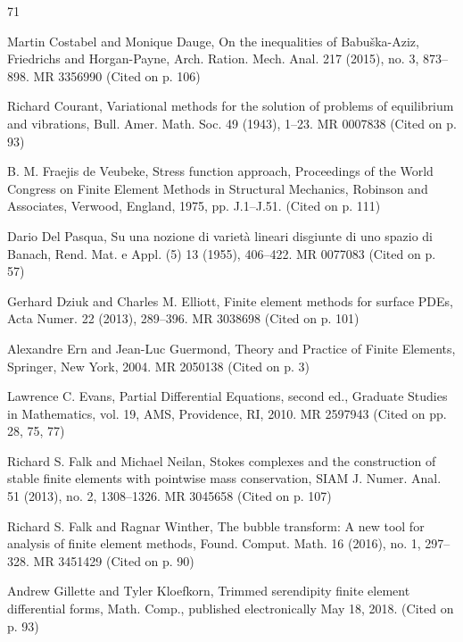 \begin{MBSourceBibliography}{71}
\item\label{bib:source-35}Martin Costabel and Monique Dauge, \newline On the inequalities of Babuška-Aziz, Friedrichs and Horgan-Payne, Arch. Ration. Mech. Anal. 217 (2015), no. 3, 873– 898. MR 3356990 (Cited on p. 106)

\item\label{bib:source-36}Richard Courant, Variational methods for the solution of problems of equilibrium and vibrations, Bull. Amer. Math. Soc. 49 (1943), 1–23. MR 0007838 (Cited on p. 93)

\item\label{bib:source-37}B. M. Fraejis de Veubeke, Stress function approach, Proceedings of the World Congress on Finite Element Methods in Structural Mechanics, Robinson and Associates, Verwood, England, 1975, pp. J.1–J.51. (Cited on p. 111)

\item\label{bib:source-38}Dario Del Pasqua, Su una nozione di varietà lineari disgiunte di uno spazio di Banach, Rend. Mat. e Appl. (5) 13 (1955), 406–422. MR 0077083 (Cited on p. 57)

\item\label{bib:source-39}Gerhard Dziuk and Charles M. Elliott, Finite element methods for surface PDEs, Acta Numer. 22 (2013), 289–396. MR 3038698 (Cited on p. 101)

\item\label{bib:source-40}Alexandre Ern and Jean-Luc Guermond, Theory and Practice of Finite Elements, Springer, New York, 2004. MR 2050138 (Cited on p. 3)

\item\label{bib:source-41}Lawrence C. Evans, Partial Differential Equations, second ed., Graduate Studies in Mathematics, vol. 19, AMS, Providence, RI, 2010. MR 2597943 (Cited on pp. 28, 75, 77)

\item\label{bib:source-42}Richard S. Falk and Michael Neilan, Stokes complexes and the construction of stable finite elements with pointwise mass conservation, SIAM J. Numer. Anal. 51 (2013), no. 2, 1308–1326. MR 3045658 (Cited on p. 107)

\item\label{bib:source-43}Richard S. Falk and Ragnar Winther, The bubble transform: A new tool for analysis of finite element methods, Found. Comput. Math. 16 (2016), no. 1, 297–328. MR 3451429 (Cited on p. 90)

\item\label{bib:source-44}Andrew Gillette and Tyler Kloefkorn, Trimmed serendipity finite element differential forms, Math. Comp., published electronically May 18, 2018. (Cited on p. 93)


\end{MBSourceBibliography}
